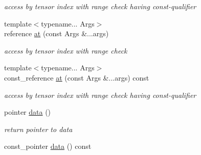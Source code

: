 \begin{DoxyCompactItemize}
\begin{DoxyCompactList}\small\item\em access by tensor index with range check having const-\/qualifier \item\end{DoxyCompactList}\item 
\hypertarget{classbtas_1_1_tensor_wrapper_3_01_t_01_5_00_01_n_00_01_order_01_4_a3ab1250980b77413fa51a7c4cefa477e}{
{\footnotesize template$<$typename... Args$>$ }\\reference \hyperlink{classbtas_1_1_tensor_wrapper_3_01_t_01_5_00_01_n_00_01_order_01_4_a3ab1250980b77413fa51a7c4cefa477e}{at} (const Args \&...args)}
\label{classbtas_1_1_tensor_wrapper_3_01_t_01_5_00_01_n_00_01_order_01_4_a3ab1250980b77413fa51a7c4cefa477e}

\begin{DoxyCompactList}\small\item\em access by tensor index with range check \item\end{DoxyCompactList}\item 
\hypertarget{classbtas_1_1_tensor_wrapper_3_01_t_01_5_00_01_n_00_01_order_01_4_a5e125e6d05cc0f269470a60e273de3f6}{
{\footnotesize template$<$typename... Args$>$ }\\const\_\-reference \hyperlink{classbtas_1_1_tensor_wrapper_3_01_t_01_5_00_01_n_00_01_order_01_4_a5e125e6d05cc0f269470a60e273de3f6}{at} (const Args \&...args) const }
\label{classbtas_1_1_tensor_wrapper_3_01_t_01_5_00_01_n_00_01_order_01_4_a5e125e6d05cc0f269470a60e273de3f6}

\begin{DoxyCompactList}\small\item\em access by tensor index with range check having const-\/qualifier \item\end{DoxyCompactList}\item 
\hypertarget{classbtas_1_1_tensor_wrapper_3_01_t_01_5_00_01_n_00_01_order_01_4_a5142ee52ebb8cf49373781ab5403ca1f}{
pointer \hyperlink{classbtas_1_1_tensor_wrapper_3_01_t_01_5_00_01_n_00_01_order_01_4_a5142ee52ebb8cf49373781ab5403ca1f}{data} ()}
\label{classbtas_1_1_tensor_wrapper_3_01_t_01_5_00_01_n_00_01_order_01_4_a5142ee52ebb8cf49373781ab5403ca1f}

\begin{DoxyCompactList}\small\item\em return pointer to data \item\end{DoxyCompactList}\item 
\hypertarget{classbtas_1_1_tensor_wrapper_3_01_t_01_5_00_01_n_00_01_order_01_4_aabea4eccb61b1e4ca7a3aeb0db8a0df7}{
const\_\-pointer \hyperlink{classbtas_1_1_tensor_wrapper_3_01_t_01_5_00_01_n_00_01_order_01_4_aabea4eccb61b1e4ca7a3aeb0db8a0df7}{data} () const }
\label{classbtas_1_1_tensor_wrapper_3_01_t_01_5_00_01_n_00_01_order_01_4_aabea4eccb61b1e4ca7a3aeb0db8a0df7}


\end{DoxyCompactItemize}
